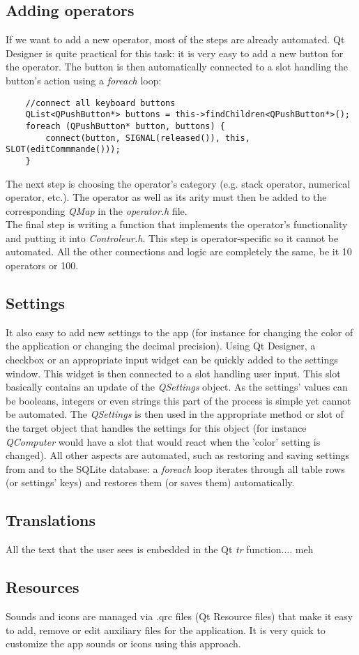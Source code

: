 \documentclass[titlepage]{article}
\begin{document}
	\subsection{Adding operators}
	If we want to add a new operator, most of the steps are already automated. Qt Designer is quite practical for this task: it is very easy to add a new button for the operator. The button is then automatically connected to a slot handling the button's action using a \textit{foreach} loop: 
	\begin{lstlisting}
    //connect all keyboard buttons
    QList<QPushButton*> buttons = this->findChildren<QPushButton*>();
    foreach (QPushButton* button, buttons) {
        connect(button, SIGNAL(released()), this, SLOT(editCommmande()));
    }
	\end{lstlisting}
	The next step is choosing the operator's category (e.g. stack operator, numerical operator, etc.). The operator as well as its arity must then be added to the corresponding \textit{QMap} in the \textit{operator.h} file. \\
	The final step is writing a function that implements the operator's functionality and putting it into \textit{Controleur.h}. This step is operator-specific so it cannot be automated. All the other connections and logic are completely the same, be it 10 operators or 100.
	\subsection{Settings}
	It also easy to add new settings to the app (for instance for changing the color of the application or changing the decimal precision). Using Qt Designer, a checkbox or an appropriate input widget can be quickly added to the settings window. This widget is then connected to a slot handling user input. This slot basically contains an update of the \textit{QSettings} object. As the settings' values can be booleans, integers or even strings this part of the process is simple yet cannot be automated. The \textit{QSettings} is then used in the appropriate method or slot of the target object that handles the settings for this object (for instance \textit{QComputer} would have a slot that would react when the 'color' setting is changed). All other aspects are automated, such as restoring and saving settings from and to the SQLite database: a \textit{foreach} loop iterates through all table rows (or settings' keys) and restores them (or saves them) automatically.
	\subsection{Translations}
	All the text that the user sees is embedded in the Qt \textit{tr} function.... meh
	\subsection{Resources}
	Sounds and icons are managed via .qrc files (Qt Resource files) that make it easy to add, remove or edit auxiliary files for the application. It is very quick to customize the app sounds or icons using this approach.
\end{document}
